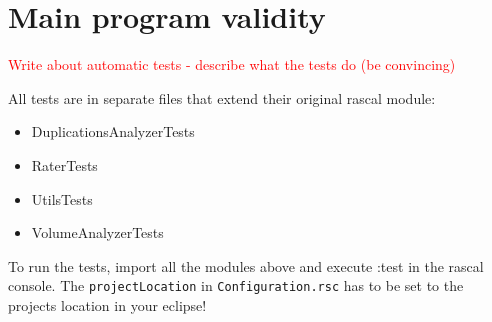 \documentclass{uva-inf-article}
\newcommand\todo[1]{\textcolor{red}{#1}}
\begin{document}
\section{Main program validity}
\todo {Write about automatic tests - describe what the tests do (be convincing)}

All tests are in separate files that extend their original rascal module:

\begin{itemize}

\item
  DuplicationsAnalyzerTests
\item
  RaterTests
\item
  UtilsTests
\item
  VolumeAnalyzerTests
\end{itemize}

To run the tests, import all the modules above and execute :test in the
rascal console. The \texttt{projectLocation} in
\texttt{Configuration.rsc} has to be set to the projects location in
your eclipse!
\end{document}
